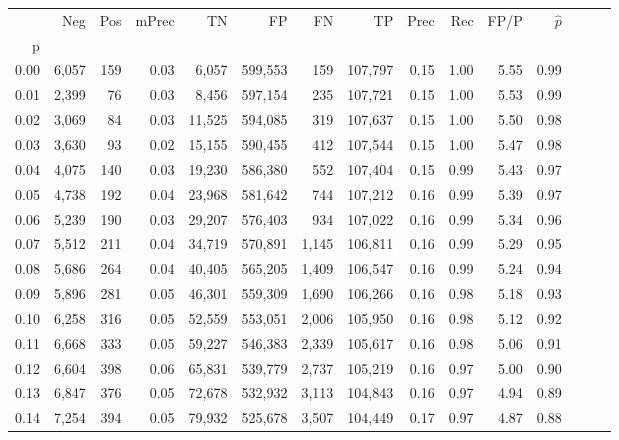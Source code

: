 \begin{tabular}{rrrrrrrrrrrrrrr}
\toprule
{} &     Neg &    Pos & mPrec &       TN &       FP &       FN &       TP &  Prec &   Rec &  FP/P & $\hat{p}$ \\
p    &         &        &       &          &          &          &          &       &       &       &           \\
\midrule
0.00 &   6,057 &    159 &  0.03 &    6,057 &  599,553 &      159 &  107,797 &  0.15 &  1.00 &  5.55 &      0.99 \\
0.01 &   2,399 &     76 &  0.03 &    8,456 &  597,154 &      235 &  107,721 &  0.15 &  1.00 &  5.53 &      0.99 \\
0.02 &   3,069 &     84 &  0.03 &   11,525 &  594,085 &      319 &  107,637 &  0.15 &  1.00 &  5.50 &      0.98 \\
0.03 &   3,630 &     93 &  0.02 &   15,155 &  590,455 &      412 &  107,544 &  0.15 &  1.00 &  5.47 &      0.98 \\
0.04 &   4,075 &    140 &  0.03 &   19,230 &  586,380 &      552 &  107,404 &  0.15 &  0.99 &  5.43 &      0.97 \\
0.05 &   4,738 &    192 &  0.04 &   23,968 &  581,642 &      744 &  107,212 &  0.16 &  0.99 &  5.39 &      0.97 \\
0.06 &   5,239 &    190 &  0.03 &   29,207 &  576,403 &      934 &  107,022 &  0.16 &  0.99 &  5.34 &      0.96 \\
0.07 &   5,512 &    211 &  0.04 &   34,719 &  570,891 &    1,145 &  106,811 &  0.16 &  0.99 &  5.29 &      0.95 \\
0.08 &   5,686 &    264 &  0.04 &   40,405 &  565,205 &    1,409 &  106,547 &  0.16 &  0.99 &  5.24 &      0.94 \\
0.09 &   5,896 &    281 &  0.05 &   46,301 &  559,309 &    1,690 &  106,266 &  0.16 &  0.98 &  5.18 &      0.93 \\
0.10 &   6,258 &    316 &  0.05 &   52,559 &  553,051 &    2,006 &  105,950 &  0.16 &  0.98 &  5.12 &      0.92 \\
0.11 &   6,668 &    333 &  0.05 &   59,227 &  546,383 &    2,339 &  105,617 &  0.16 &  0.98 &  5.06 &      0.91 \\
0.12 &   6,604 &    398 &  0.06 &   65,831 &  539,779 &    2,737 &  105,219 &  0.16 &  0.97 &  5.00 &      0.90 \\
0.13 &   6,847 &    376 &  0.05 &   72,678 &  532,932 &    3,113 &  104,843 &  0.16 &  0.97 &  4.94 &      0.89 \\
0.14 &   7,254 &    394 &  0.05 &   79,932 &  525,678 &    3,507 &  104,449 &  0.17 &  0.97 &  4.87 &      0.88 \\

\end{tabular}
